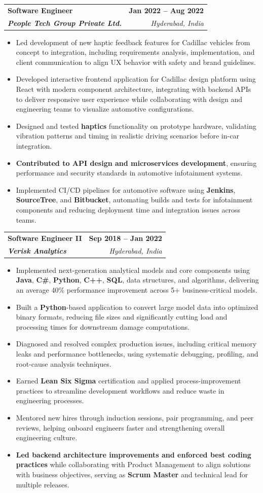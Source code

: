 \documentclass[letterpaper,11pt]{article}
\makeatletter
\newcommand{\resumeItem}[1]{
  \item\small{
    {#1 \vspace{-2pt}}
  }
}
\newcommand{\resumeSubheading}[4]{
  \vspace{-2pt}\item
    \begin{tabular*}{1.0\textwidth}[t]{l@{\extracolsep{\fill}}r}
      \textbf{#1} & \textbf{\small #2} \\
      \textit{\small#3} & \textit{\small #4} \\
    \end{tabular*}\vspace{-7pt}
}
\newcommand{\resumeItemListStart}{\begin{itemize}}
\newcommand{\resumeItemListEnd}{\end{itemize}\vspace{-5pt}}
\makeatother
\begin{document}
    \resumeSubheading
      {\textbf{Software Engineer}}{\textbf{Jan 2022 -- Aug 2022}}
      {\textbf{People Tech Group Private Ltd.}}{Hyderabad, India}
      \resumeItemListStart
        \resumeItem{Led development of new haptic feedback features for Cadillac vehicles from concept to integration, including requirements analysis, implementation, and client communication to align UX behavior with safety and brand guidelines.}
        \resumeItem{Developed interactive frontend application for Cadillac design platform using React with modern component architecture, integrating with backend APIs to deliver responsive user experience while collaborating with design and engineering teams to visualize automotive configurations.}
        \resumeItem{Designed and tested \textbf{haptics} functionality on prototype hardware, validating vibration patterns and timing in realistic driving scenarios before in-car integration.}
        \resumeItem{\textbf{Contributed to API design and microservices development}, ensuring performance and security standards in automotive infotainment systems.}
        \resumeItem{Implemented CI/CD pipelines for automotive software using \textbf{Jenkins}, \textbf{SourceTree}, and \textbf{Bitbucket}, automating builds and tests for infotainment components and reducing deployment time and integration issues across teams.}
      \resumeItemListEnd

    \resumeSubheading
      {\textbf{Software Engineer II}}{\textbf{Sep 2018 -- Jan 2022}}
      {\textbf{Verisk Analytics}}{Hyderabad, India}
      \resumeItemListStart
        \resumeItem{Implemented next-generation analytical models and core components using \textbf{Java}, \textbf{C\#}, \textbf{Python}, \textbf{C++}, \textbf{SQL}, data structures, and algorithms, delivering an average 40\% performance improvement across 5+ business-critical models.}
        \resumeItem{Built a \textbf{Python}-based application to convert large model data into optimized binary formats, reducing file sizes and significantly cutting load and processing times for downstream damage computations.}
        \resumeItem{Diagnosed and resolved complex production issues, including critical memory leaks and performance bottlenecks, using systematic debugging, profiling, and root-cause analysis techniques.}
        \resumeItem{Earned \textbf{Lean Six Sigma} certification and applied process-improvement practices to streamline development workflows and reduce waste in engineering processes.}
        \resumeItem{Mentored new hires through induction sessions, pair programming, and peer reviews, helping onboard engineers faster and strengthening overall engineering culture.}
        \resumeItem{\textbf{Led backend architecture improvements and enforced best coding practices} while collaborating with Product Management to align solutions with business objectives, serving as \textbf{Scrum Master} and technical lead for multiple releases.}
      \resumeItemListEnd
\end{document}
